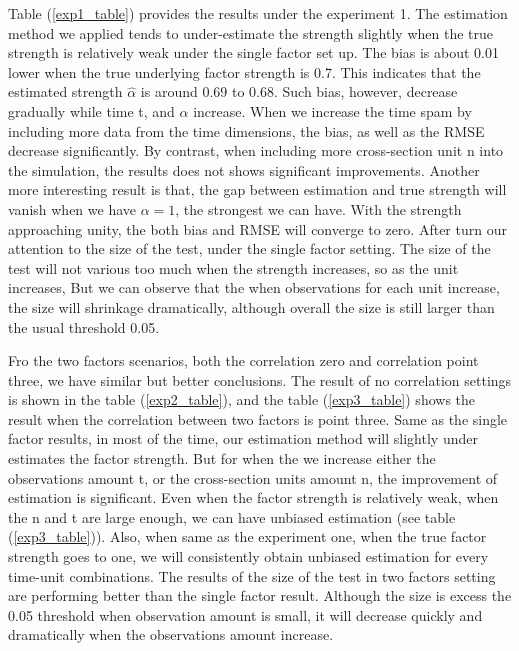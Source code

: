 \documentclass[12pt]{article}
\begin{document}
Table (\ref{exp1_table}) provides the results under the experiment 1.
The estimation method we applied tends to under-estimate the strength slightly when the true strength is relatively weak under the single factor set up.
The bias is about 0.01 lower when the true underlying factor strength is 0.7.
This indicates that the estimated strength $\hat{\alpha}$ is around 0.69 to 0.68.
Such bias, however, decrease gradually while time t, and  $\alpha$ increase.
When we increase the time spam by including more data from the time dimensions, the bias, as well as the RMSE decrease significantly.
By contrast, when including more cross-section unit n into the simulation, the results does not shows significant improvements.
Another more interesting result is that, the gap between estimation and true strength will vanish when we have $\alpha = 1$, the strongest we can have.
With the strength approaching unity, the both bias and RMSE will converge to zero.
After turn our attention to the size of the test, under the single factor setting.
The size of the test will not various too much when the strength increases, so as the unit increases,
But we can observe that the when observations for each unit increase, the size will shrinkage dramatically, although overall the size is still larger than the usual threshold 0.05.

Fro the two factors scenarios, both the correlation zero and correlation point three, we have similar but better conclusions.
The result of no correlation settings is shown in the table (\ref{exp2_table}), and the table (\ref{exp3_table}) shows the result when the correlation between two factors is point three.
Same as the single factor results, in most of the time, our estimation method will slightly under estimates the factor strength. 
But for when the we increase either the observations amount t, or the cross-section units amount n, the improvement of estimation is significant. 
Even when the factor strength is relatively weak, when the n and t are large enough, we can have unbiased estimation (see table (\ref{exp3_table})).
Also, when same as the experiment one, when the true factor strength goes to one, we will consistently obtain unbiased estimation for every time-unit combinations.
The results of the  size of the test in two factors setting are performing better than the single factor result. 
Although the size is excess the 0.05 threshold when observation amount is small, it will decrease quickly and dramatically when the observations amount increase.


\newpage



\newpage
\appendix



		
\end{document}
